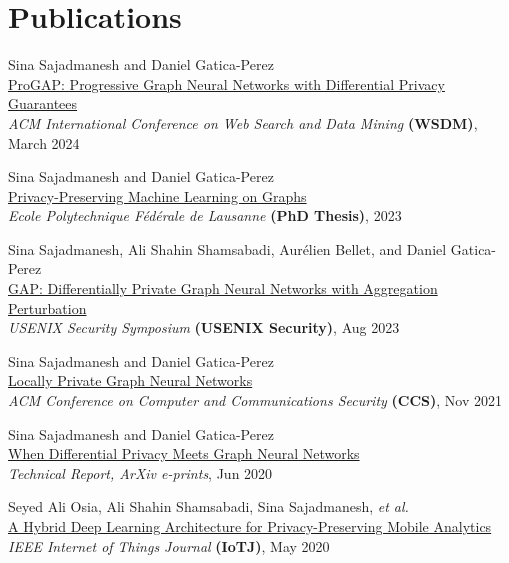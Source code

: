 \documentclass[11pt]{article}
\begin{document}
\section{Publications}

\begin{outerlist}

	\item {Sina Sajadmanesh} and Daniel Gatica-Perez\\
	\href{https://dl.acm.org/doi/10.1145/3616855.3635761}{{ProGAP: Progressive Graph Neural Networks with Differential Privacy Guarantees}}\\
	\textit{ACM International Conference on Web Search and Data Mining
  } \textbf{(WSDM)}, March 2024

  \item {Sina Sajadmanesh} and Daniel Gatica-Perez\\
	\href{https://infoscience.epfl.ch/record/306602}{{Privacy-Preserving Machine Learning on Graphs}}\\
	\textit{Ecole Polytechnique Fédérale de Lausanne} \textbf{(PhD Thesis)}, 2023

	\item {Sina Sajadmanesh}, Ali Shahin Shamsabadi, Aurélien Bellet, and Daniel Gatica-Perez\\
	\href{https://www.usenix.org/conference/usenixsecurity23/presentation/sajadmanesh}{{GAP: Differentially Private Graph Neural Networks with Aggregation Perturbation}}\\
	\textit{USENIX Security Symposium }\textbf{(USENIX Security)}, Aug 2023

	\item {Sina Sajadmanesh} and Daniel Gatica-Perez\\
	\href{https://dl.acm.org/doi/abs/10.1145/3460120.3484565}{{Locally Private Graph Neural Networks}}\\
	\textit{ACM Conference on Computer and Communications Security }\textbf{(CCS)}, Nov 2021

  \item {Sina Sajadmanesh} and Daniel Gatica-Perez\\
	\href{https://arxiv.org/abs/2006.05535v3}{{When Differential Privacy Meets Graph Neural Networks}}\\
	\textit{Technical Report, ArXiv e-prints}, Jun 2020

	\item Seyed Ali Osia, Ali Shahin Shamsabadi, {Sina Sajadmanesh}, \textit{et al.}\\
	\href{https://ieeexplore.ieee.org/document/8962332}{{A Hybrid Deep Learning Architecture for Privacy-Preserving Mobile Analytics}}\\
	\textit{IEEE Internet of Things Journal} \textbf{(IoTJ)}, May 2020


\end{outerlist}
\end{document}
